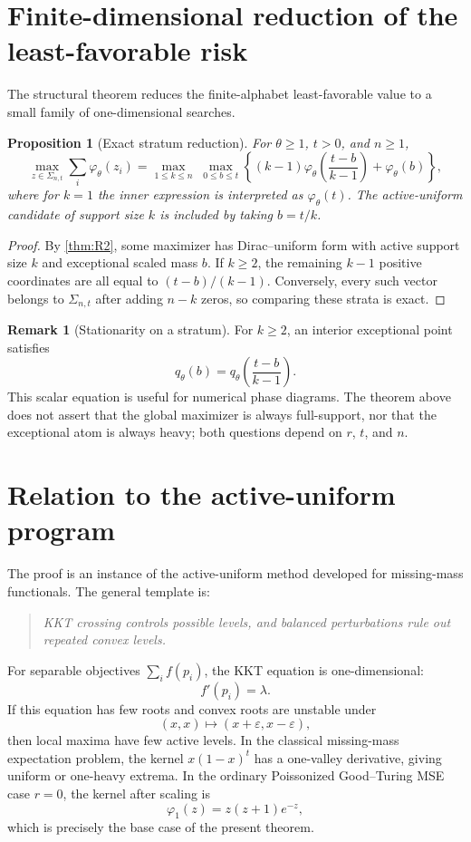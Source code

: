 \documentclass[11pt]{article}
\newtheorem{proposition}[theorem]{Proposition}
\theoremstyle{definition}
\newtheorem{remark}[theorem]{Remark}
\begin{document}
\section{Finite-dimensional reduction of the least-favorable risk}\label{sec:finite-reduction}

The structural theorem reduces the finite-alphabet least-favorable value to a small family of one-dimensional searches.

\begin{proposition}[Exact stratum reduction]\label{prop:stratum}
For $\theta\ge1$, $t>0$, and $n\ge1$,
\[
  \max_{z\in\Sigma_{n,t}}\sum_i\varphi_\theta(z_i)
  =\max_{1\le k\le n}\;\max_{0\le b\le t}
  \left\{(k-1)\varphi_\theta\!
    \left(\frac{t-b}{k-1}\right)+\varphi_\theta(b)\right\},
\]
where for $k=1$ the inner expression is interpreted as $\varphi_\theta(t)$.  The active-uniform candidate of support size $k$ is included by taking $b=t/k$.
\end{proposition}

\begin{proof}
By \cref{thm:R2}, some maximizer has Dirac--uniform form with active support size $k$ and exceptional scaled mass $b$.  If $k\ge2$, the remaining $k-1$ positive coordinates are all equal to $(t-b)/(k-1)$.  Conversely, every such vector belongs to $\Sigma_{n,t}$ after adding $n-k$ zeros, so comparing these strata is exact.
\end{proof}

\begin{remark}[Stationarity on a stratum]
For $k\ge2$, an interior exceptional point satisfies
\[
  q_\theta(b)=q_\theta\left(\frac{t-b}{k-1}\right).
\]
This scalar equation is useful for numerical phase diagrams.  The theorem above does not assert that the global maximizer is always full-support, nor that the exceptional atom is always heavy; both questions depend on $r$, $t$, and $n$.
\end{remark}

\section{Relation to the active-uniform program}\label{sec:connections}

The proof is an instance of the active-uniform method developed for missing-mass functionals.  The general template is:
\begin{quote}
\emph{KKT crossing controls possible levels, and balanced perturbations rule out repeated convex levels.}
\end{quote}
For separable objectives $\sum_i f(p_i)$, the KKT equation is one-dimensional:
\[
  f'(p_i)=\lambda.
\]
If this equation has few roots and convex roots are unstable under
\[
  (x,x)\mapsto(x+\varepsilon,x-\varepsilon),
\]
then local maxima have few active levels.  In the classical missing-mass expectation problem, the kernel $x(1-x)^t$ has a one-valley derivative, giving uniform or one-heavy extrema.  In the ordinary Poissonized Good--Turing MSE case $r=0$, the kernel after scaling is
\[
  \varphi_1(z)=z(z+1)e^{-z},
\]
which is precisely the base case of the present theorem.
\end{document}
